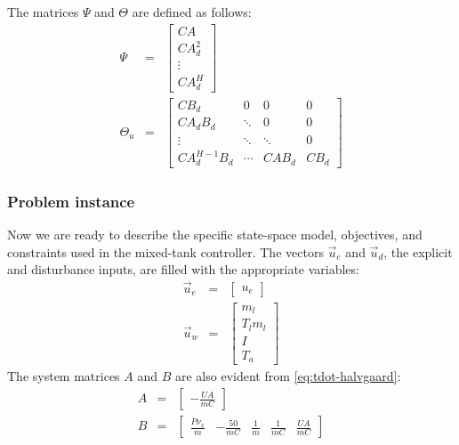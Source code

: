 The matrices $\Psi$ and $\Theta$ are defined as follows:
\begin{eqnarray}
   \label{eq:mpc-psi}
   \Psi &=& \left[\begin{array}{c}
      CA \\ CA_d^2 \\ \vdots \\ CA_d^H
   \end{array}\right]
   \\
	\label{eq:mpc-theta}
   \Theta_u &=& \left[\begin{array}{cccc}
		C B_d & 0 & 0 & 0 \\
		C A_d B_d & \ddots & 0 & 0 \\
      \vdots & \ddots & \ddots & 0 \\
		C A_d ^{H-1} B_d & \cdots & C A B_d & C B_d
   \end{array}\right]
\end{eqnarray}

\subsubsection{Problem instance}

Now we are ready to describe the specific state-space model, objectives, and constraints used in the mixed-tank controller.
The vectors $\vec{u}_e$ and $\vec{u}_d$, the explicit and disturbance inputs, are filled with the appropriate variables:
\begin{eqnarray}
   \vec{u}_e &=& \left[\begin{array}{c}
		u_e
	\end{array} \right]
	\\
   \vec{u}_w &=& \left[\begin{array}{cccc}
		m_l \\ T_l m_l \\ I \\ T_a
	\end{array} \right]
\end{eqnarray}
The system matrices $A$ and $B$ are also evident from \autoref{eq:tdot-halvgaard}:
\begin{eqnarray}
	A &=& \left[\begin{array}{c}
		-\frac{UA}{mC}
	\end{array} \right]
	\\
	B &=& \left[\begin{array}{ccccc}
		\frac{P \nu_x}{m} &
		-\frac{50}{mC} &
		\frac{1}{m} &
		\frac{1}{mC} &
		\frac{UA}{mC}
	\end{array} \right]
\end{eqnarray}

